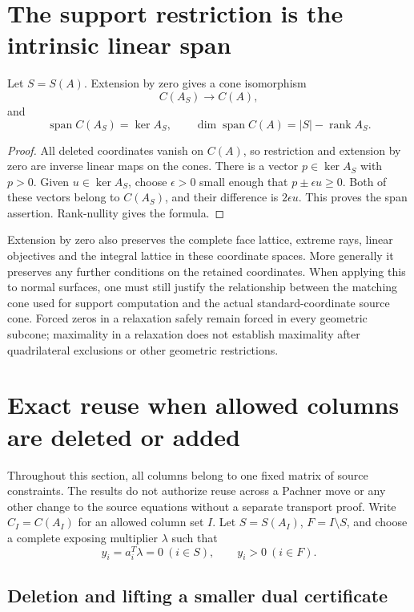 \section{The support restriction is the intrinsic linear span}

\begin{proposition}
Let $S=S(A)$.  Extension by zero gives a cone isomorphism
\[
 C(A_S)\longrightarrow C(A),
\]
and
\[
 \operatorname{span} C(A_S)=\ker A_S,
 \qquad \dim\operatorname{span} C(A)=|S|-\operatorname{rank} A_S.
\]
\end{proposition}

\begin{proof}
All deleted coordinates vanish on $C(A)$, so restriction and extension
by zero are inverse linear maps on the cones.  There is a vector
$p\in\ker A_S$ with $p>0$.  Given $u\in\ker A_S$, choose
$\epsilon>0$ small enough that $p\pm\epsilon u\geq0$.  Both of these
vectors belong to $C(A_S)$, and their difference is $2\epsilon u$.
This proves the span assertion.  Rank-nullity gives the formula.
\end{proof}

Extension by zero also preserves the complete face lattice, extreme
rays, linear objectives and the integral lattice in these coordinate
spaces.  More generally it preserves any further conditions on the
retained coordinates.  When applying this to normal surfaces, one must
still justify the relationship between the matching cone used for
support computation and the actual standard-coordinate source cone.
Forced zeros in a relaxation safely remain forced in every geometric
subcone; maximality in a relaxation does not establish maximality after
quadrilateral exclusions or other geometric restrictions.

\section{Exact reuse when allowed columns are deleted or added}

Throughout this section, all columns belong to one fixed matrix of
source constraints.  The results do not authorize reuse across a
Pachner move or any other change to the source equations without a
separate transport proof.  Write $C_I=C(A_I)$ for an allowed column set
$I$.  Let $S=S(A_I)$, $F=I\setminus S$, and choose a complete exposing
multiplier $\lambda$ such that
\[
 y_i=a_i^T\lambda=0\ (i\in S),\qquad
 y_i>0\ (i\in F).
\]

\subsection{Deletion and lifting a smaller dual certificate}

